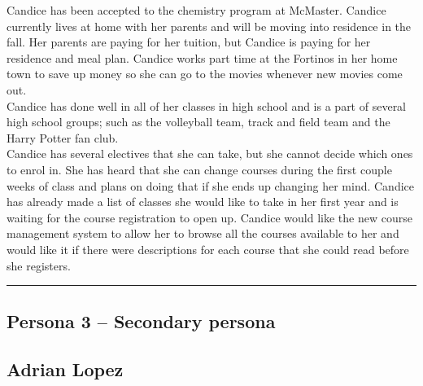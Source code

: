 \documentclass[12pt]{article}
\begin{document}
Candice has been accepted to the chemistry program at McMaster. Candice currently lives at home with her parents and will be moving into residence in the fall. Her parents are paying for her tuition, but Candice is paying for her residence and meal plan. Candice works part time at the Fortinos in her home town to save up money so she can go to the movies whenever new movies come out.\\

Candice has done well in all of her classes in high school and is a part of several high school groups; such as the volleyball team, track and field team and the Harry Potter fan club.\\

Candice has several electives that she can take, but she cannot decide which ones to enrol in. She has heard that she can change courses during the first couple weeks of class and plans on doing that if she ends up changing her mind. Candice has already made a list of classes she would like to take in her first year and is waiting for the course registration to open up. Candice would like the new course management system to allow her to browse all the courses available to her and would like it if there were descriptions for each course that she could read before she registers.

\newpage
\hrule
\vspace{2mm}
\subsection{Persona 3 -- Secondary persona}
\vspace{11mm}

\subsection*{Adrian Lopez}
\vspace{4mm}
\end{document}
